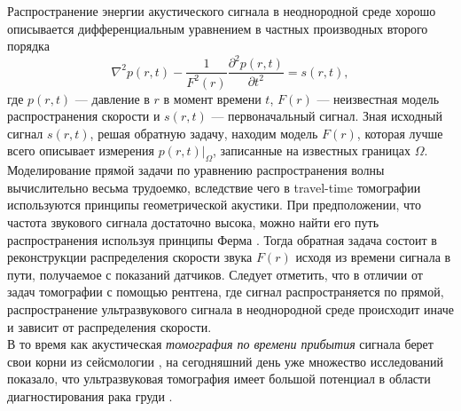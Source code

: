 \documentclass[14pt]{matmex-diploma-custom}
\begin{document}
Распространение энергии акустического сигнала в неоднородной среде хорошо описывается дифференциальным уравнением в частных производных второго порядка
$$\nabla^2p(r,t) - \frac{1}{F^2(r)}\frac{\partial^2p(r,t)}{\partial t^2} = s(r,t),$$
где $p(r, t)$ --- давление в $r$ в момент времени $t$, $F(r)$ --- неизвестная модель распространения скорости и $s(r,t)$ --- первоначальный сигнал. Зная исходный сигнал $s(r, t)$, решая обратную задачу, находим модель $F(r)$, которая лучше всего описывает измерения $p(r,t)|_{\Omega}$, записанные на известных границах $\Omega$.\\

Моделирование прямой задачи по уравнению распространения волны вычислительно весьма трудоемко, вследствие чего в travel-time томографии используются принципы геометрической акустики. При предположении, что частота звукового сигнала достаточно высока, можно найти его путь распространения используя принципы Ферма \cite{schuster1904introduction}. Тогда обратная задача состоит в реконструкции распределения скорости звука $F(r)$ исходя из времени сигнала в пути, получаемое с показаний датчиков. Следует отметить, что в отличии от задач томографии с помощью рентгена, где сигнал распространяется по прямой, распространение ультразвукового сигнала в неоднородной среде происходит иначе и зависит от распределения скорости.\\

В то время как акустическая \textit{томография по времени прибытия} сигнала берет свои корни из сейсмологии \cite{dines1979computerized}, на сегодняшний день уже множество исследований показало, что ультразвуковая томография имеет большой потенциал в области диагностирования рака груди \cite{duric2007detection}. \\
\end{document}
